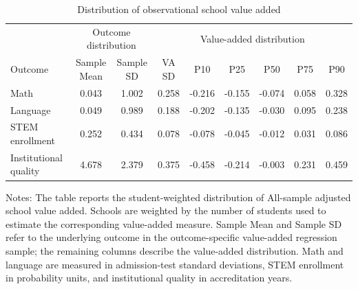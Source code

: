 \begin{table}[!htbp]
\centering
\begin{threeparttable}
\caption{Distribution of observational school value added}
\label{tab:school-va-distribution}
\small
\setlength{\tabcolsep}{3.5pt}
\begin{tabular}{lcc|cccccc}
\toprule
 & \multicolumn{2}{c|}{Outcome distribution} & \multicolumn{6}{c}{Value-added distribution} \\
\cmidrule(lr){2-3} \cmidrule(lr){4-9}
Outcome & \shortstack{Sample\\Mean} & \shortstack{Sample\\SD} & VA SD & P10 & P25 & P50 & P75 & P90 \\
\midrule
Math & 0.043 & 1.002 & 0.258 & -0.216 & -0.155 & -0.074 & 0.058 & 0.328 \\
Language & 0.049 & 0.989 & 0.188 & -0.202 & -0.135 & -0.030 & 0.095 & 0.238 \\
STEM enrollment & 0.252 & 0.434 & 0.078 & -0.078 & -0.045 & -0.012 & 0.031 & 0.086 \\
Institutional quality & 4.678 & 2.379 & 0.375 & -0.458 & -0.214 & -0.003 & 0.231 & 0.459 \\
\bottomrule
\end{tabular}
\begin{tablenotes}[flushleft]
\footnotesize
\item Notes: The table reports the student-weighted distribution of All-sample adjusted school value added. Schools are weighted by the number of students used to estimate the corresponding value-added measure. Sample Mean and Sample SD refer to the underlying outcome in the outcome-specific value-added regression sample; the remaining columns describe the value-added distribution. Math and language are measured in admission-test standard deviations, STEM enrollment in probability units, and institutional quality in accreditation years.
\end{tablenotes}
\end{threeparttable}
\end{table}
